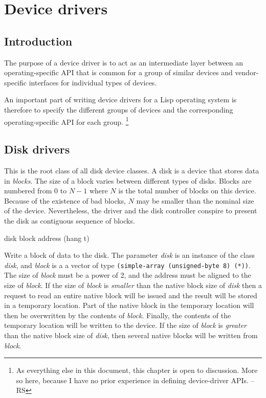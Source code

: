 \chapter{Device drivers}

\section{Introduction}

The purpose of a device driver is to act as an intermediate layer
between an operating-specific API that is common for a group of
similar devices and vendor-specific interfaces for individual types of
devices. 

An important part of writing device drivers for a Lisp operating
system is therefore to specify the different groups of devices and the
corresponding operating-specific API for each group.%
\footnote{As everything else in this document, this chapter is open to
  discussion.  More so here, because I have no prior experience in
  defining device-driver APIs. -- RS}

\section{Disk drivers}


This is the root class of all disk device classes.  A disk is a device
that stores data in \emph{blocks}.  The size of a block varies between
different types of disks.  Blocks are numbered from $0$ to $N-1$ where
$N$ is the total number of blocks on this device.  Because of the
existence of bad blocks, $N$ may be smaller than the nominal size of
the device.  Nevertheless, the driver and the disk controller conspire
to present the disk as contiguous sequence of blocks. 


 {disk block address \key (hang t)}

Write a block of data to the disk.  The parameter \textit{disk} is an
instance of the class \textit{disk}, and \textit{block} is a a vector
of type \texttt{(simple-array (unsigned-byte 8) (*))}.  The size of
\textit{block} must be a power of 2, and the address must be aligned
to the size of \textit{block}.  If the size of \textit{block} is
\emph{smaller} than the native block size of \textit{disk} then a
request to read an entire native block will be issued and the result
will be stored in a temporary location.  Part of the native block in
the temporary location will then be overwritten by the contents of
\textit{block}.  Finally, the contents of the temporary location will
be written to the device.  If the size of \textit{block} is
\emph{greater} than the native block size of \textit{disk}, then
several native blocks will be written from \textit{block}.

